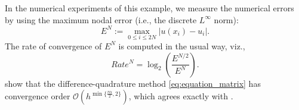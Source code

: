 \documentclass{amsart}
\theoremstyle{definition}
\theoremstyle{remark}
\numberwithin{equation}{section}
\begin{document}
In the numerical experiments of this example, we measure the numerical errors by using the maximum nodal error (i.e., the discrete \(L^\infty\) norm):
\begin{equation*}
    E^N := \max_{0\le i\le 2N} |u(x_i) - u_i|.
\end{equation*}
The rate of convergence of \(E^N\) is computed in the usual way, viz.,
\begin{equation*}
    Rate^N = \log_2 \left( \frac{E^{N/2}}{E^{N}} \right).
\end{equation*}
 show that the difference-quadrature method \eqref{eq:equation_matrix} has convergence order
$\mathcal{O}(h^{\min\{\frac{r\alpha}{2}, 2\}})$, which agrees exactly with .
\end{document}
